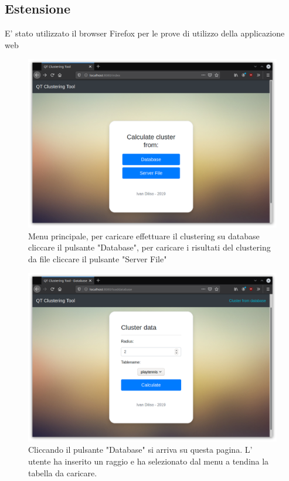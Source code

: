 \documentclass{article}
\begin{document}
 



    \subsection{Estensione}
    E' stato utilizzato il browser Firefox per le prove di utilizzo della 
    applicazione web


    \begin{figure}[H]
        \includegraphics[scale=0.4]{ADDON1}
        \caption{Menu principale, per caricare effettuare il clustering su 
        database cliccare il pulsante "Database", per caricare i risultati del
        clustering da file cliccare il pulsante "Server File"}   
        \label{fig:5}
    \end{figure} 
    \begin{figure}[H]
        \includegraphics[scale=0.4]{ADDON2}
        \caption{Cliccando il pulsante "Database" si arriva su questa pagina. L'
        utente ha inserito un raggio e ha selezionato dal menu a tendina 
        la tabella da caricare. }   
        \label{fig:6}
    \end{figure} 
\end{document}
